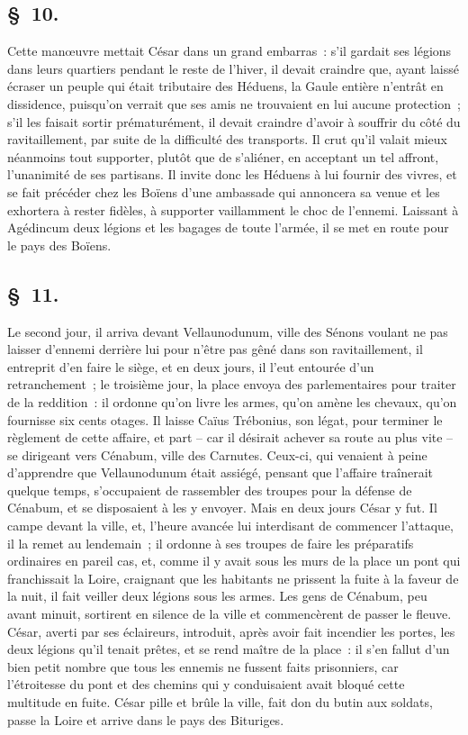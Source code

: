 \documentclass[french,twoside]{book} %
\begin{document}
\subsection[{§ 10.}]{ \textsc{§ 10.} }
\noindent Cette manœuvre mettait César dans un grand embarras : s’il gardait ses légions dans leurs quartiers pendant le reste de l’hiver, il devait craindre que, ayant laissé écraser un peuple qui était tributaire des Héduens, la Gaule entière n’entrât en dissidence, puisqu’on verrait que ses amis ne trouvaient en lui aucune protection ; s’il les faisait sortir prématurément, il devait craindre d’avoir à souffrir du côté du ravitaillement, par suite de la difficulté des transports. Il crut qu’il valait mieux néanmoins tout supporter, plutôt que de s’aliéner, en acceptant un tel affront, l’unanimité de ses partisans. Il invite donc les Héduens à lui fournir des vivres, et se fait précéder chez les Boïens d’une ambassade qui annoncera sa venue et les exhortera à rester fidèles, à supporter vaillamment le choc de l’ennemi. Laissant à Agédincum deux légions et les bagages de toute l’armée, il se met en route pour le pays des Boïens.
\subsection[{§ 11.}]{ \textsc{§ 11.} }
\noindent Le second jour, il arriva devant Vellaunodunum, ville des Sénons voulant ne pas laisser d’ennemi derrière lui pour n’être pas gêné dans son ravitaillement, il entreprit d’en faire le siège, et en deux jours, il l’eut entourée d’un retranchement ; le troisième jour, la place envoya des parlementaires pour traiter de la reddition : il ordonne qu’on livre les armes, qu’on amène les chevaux, qu’on fournisse six cents otages. Il laisse Caïus Trébonius, son légat, pour terminer le règlement de cette affaire, et part – car il désirait achever sa route au plus vite – se dirigeant vers Cénabum, ville des Carnutes. Ceux-ci, qui venaient à peine d’apprendre que Vellaunodunum était assiégé, pensant que l’affaire traînerait quelque temps, s’occupaient de rassembler des troupes pour la défense de Cénabum, et se disposaient à les y envoyer. Mais en deux jours César y fut. Il campe devant la ville, et, l’heure avancée lui interdisant de commencer l’attaque, il la remet au lendemain ; il ordonne à ses troupes de faire les préparatifs ordinaires en pareil cas, et, comme il y avait sous les murs de la place un pont qui franchissait la Loire, craignant que les habitants ne prissent la fuite à la faveur de la nuit, il fait veiller deux légions sous les armes. Les gens de Cénabum, peu avant minuit, sortirent en silence de la ville et commencèrent de passer le fleuve. César, averti par ses éclaireurs, introduit, après avoir fait incendier les portes, les deux légions qu’il tenait prêtes, et se rend maître de la place : il s’en fallut d’un bien petit nombre que tous les ennemis ne fussent faits prisonniers, car l’étroitesse du pont et des chemins qui y conduisaient avait bloqué cette multitude en fuite. César pille et brûle la ville, fait don du butin aux soldats, passe la Loire et arrive dans le pays des Bituriges.
\end{document}

